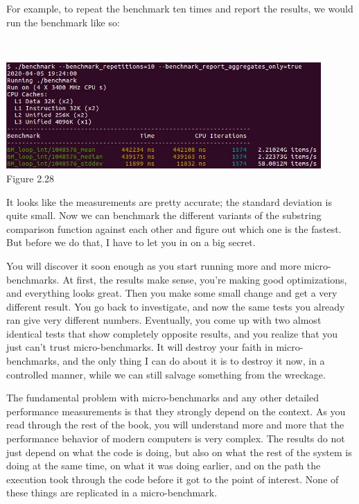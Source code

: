 For example, to repeat the benchmark ten times and report the results, we would run the benchmark like so:

\hspace*{\fill} \\ %
\begin{center}
\includegraphics[width=0.9\textwidth]{content/1/chapter2/images/28.jpg}\\
Figure 2.28
\end{center}

It looks like the measurements are pretty accurate; the standard deviation is quite small. Now we can benchmark the different variants of the substring comparison function against each other and figure out which one is the fastest. But before we do that, I have to let you in on a big secret.


You will discover it soon enough as you start running more and more micro-benchmarks. At first, the results make sense, you're making good optimizations, and everything looks great. Then you make some small change and get a very different result. You go back to investigate, and now the same tests you already ran give very different numbers. Eventually, you come up with two almost identical tests that show completely opposite results, and you realize that you just can't trust micro-benchmarks. It will destroy your faith in micro-benchmarks, and the only thing I can do about it is to destroy it now, in a controlled manner, while we can still salvage something from the wreckage.

The fundamental problem with micro-benchmarks and any other detailed performance measurements is that they strongly depend on the context. As you read through the rest of the book, you will understand more and more that the performance behavior of modern computers is very complex. The results do not just depend on what the code is doing, but also on what the rest of the system is doing at the same time, on what it was doing earlier, and on the path the execution took through the code before it got to the point of interest. None of these things are replicated in a micro-benchmark.

